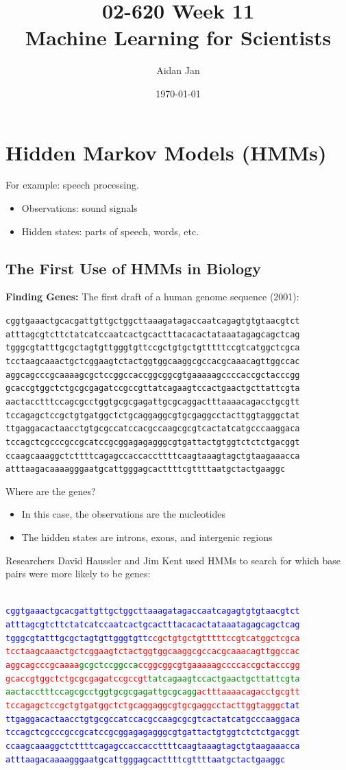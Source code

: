 \documentclass[10pt]{article}
\title{02-620 Week 11 \\ \large{Machine Learning for Scientists}}
\author{Aidan Jan}
\date{\today}
\begin{document}
\maketitle

\section*{Hidden Markov Models (HMMs)}
For example: speech processing.
\begin{itemize}
	\item Observations: sound signals
	\item Hidden states: parts of speech, words, etc.
\end{itemize}

\subsection*{The First Use of HMMs in Biology}
\textbf{Finding Genes:} The first draft of a human genome sequence (2001):
\begin{center}
\texttt{cggtgaaactgcacgattgttgctggcttaaagatagaccaatcagagtgtgtaacgtct
atttagcgtcttctatcatccaatcactgcactttacacactataaatagagcagctcag
tgggcgtatttgcgctagtgttgggtgttccgctgtgctgtttttccgtcatggctcgca
tcctaagcaaactgctcggaagtctactggtggcaaggcgccacgcaaacagttggccac
aggcagcccgcaaaagcgctccggccaccggcggcgtgaaaaagccccaccgctacccgg
gcaccgtggctctgcgcgagatccgccgttatcagaagtccactgaactgcttattcgta
aactacctttccagcgcctggtgcgcgagattgcgcaggactttaaaacagacctgcgtt
tccagagctccgctgtgatggctctgcaggaggcgtgcgaggcctacttggtagggctat
ttgaggacactaacctgtgcgccatccacgccaagcgcgtcactatcatgcccaaggaca
tccagctcgcccgccgcatccgcggagagagggcgtgattactgtggtctctctgacggt
ccaagcaaaggctcttttcagagccaccaccttttcaagtaaagtagctgtaagaaacca
atttaagacaaaagggaatgcattgggagcacttttcgttttaatgctactgaaggc}
\end{center}
Where are the genes? 
\begin{itemize}
	\item In this case, the observations are the nucleotides
	\item The hidden states are introns, exons, and intergenic regions
\end{itemize}
Researchers David Haussler and Jim Kent used HMMs to search for which base pairs were more likely to be genes:\\\\
\begin{center}
\texttt{\textcolor{blue}{cggtgaaactgcacgattgttgctggcttaaagatagaccaatcagagtgtgtaacgtct
atttagcgtcttctatcatccaatcactgcactttacacactataaatagagcagctcag
tgggcgtatttgcgctagtgttgggtgttc}\textcolor{red}{cgctgtgctgtttttccgtcatggctcgca
tcctaagcaaactgctcggaagtctactggtggcaaggcgccacgcaaacagttggccac
aggcagcccgcaaaa}\textcolor{green}{gcgctccggcca}\textcolor{red}{ccggcggcgtgaaaaagccccaccgctacccgg
gcaccgtggctctgcgcgagatccgccgt}\textcolor{green}{tatcagaagtccactgaactgcttattcgta
aactacctttccagcgcctggtgcgcgagattgcgcagg}\textcolor{red}{actttaaaacagacctgcgtt
tccagagctccgctgtgatggctctgcaggaggcgtgcgaggcctacttggtagggc}\textcolor{blue}{tat
ttgaggacactaacctgtgcgccatccacgccaagcgcgtcactatcatgcccaaggaca
tccagctcgcccgccgcatccgcggagagagggcgtgattactgtggtctctctgacggt
ccaagcaaaggctcttttcagagccaccaccttttcaagtaaagtagctgtaagaaacca
atttaagacaaaagggaatgcattgggagcacttttcgttttaatgctactgaaggc}}
\end{center}
\end{document}
